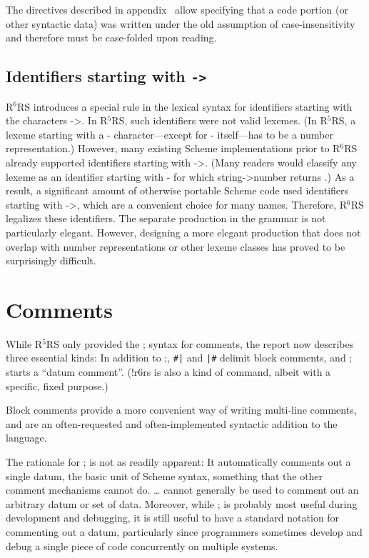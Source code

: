 \documentclass[twoside,twocolumn]{algol60}
\newcommand{\rn}[1]{R$^{#1}$RS}
\begin{document}
The directives described in
appendix~ allow specifying that a code portion (or other
syntactic data) was written under the old assumption of
case-insensitivity and therefore must be case-folded upon reading.

\subsection{Identifiers starting with {\tt ->}}

\rn{6} introduces a special rule in the lexical syntax for
identifiers starting with the characters {\cf ->}.  In \rn{5}, such
identifiers were not valid lexemes.  (In \rn{5}, a lexeme starting
with a {\cf -} character---except for {\cf -} itself---has to be a
number representation.)
However, many existing
Scheme implementations prior to \rn{6} already supported identifiers
starting with {\cf ->}.  (Many readers would classify any lexeme as an
identifier starting with {\cf -} for which {\cf string->number}
returns \schfalse{}.)  As a result, a significant amount of otherwise
portable Scheme code used identifiers starting with {\cf ->}, which
are a convenient choice for many names.  Therefore, \rn{6} legalizes
these identifiers.  The separate production in the grammar is not particularly elegant.
However, designing a more elegant production that does not overlap with
number representations or other lexeme classes has proved to be surprisingly
difficult.

 
\section{Comments}

While \rn{5} only provided the {\cf;} syntax for comments, the report
now describes three essential kinds: In addition to {\cf;}, {\tt \#|}
and {\tt |\#} delimit block comments, and {\cf\sharpsign;} starts a
``datum comment''.  ({\cf\sharpsign!r6rs} is also a kind of command,
albeit with a specific, fixed purpose.) 

Block comments provide a more convenient way of writing multi-line
comments, and are an often-requested and often-implemented syntactic
addition to the language. 

The rationale for {\cf\sharpsign;} is not as readily apparent: It
automatically comments out a single datum, the basic unit of Scheme
syntax, something that the other comment mechanisms cannot do.  {\cf
  \sharpsign\verticalbar} \ldots {\cf \verticalbar\sharpsign} cannot
generally be used to comment out an arbitrary datum or set of data.
Moreover, while {\cf\sharpsign;} is probably most useful during
development and debugging, it is still useful to have a standard
notation for commenting out a datum, particularly since programmers
sometimes develop and debug a single piece of code concurrently on
multiple systems.
\end{document}
